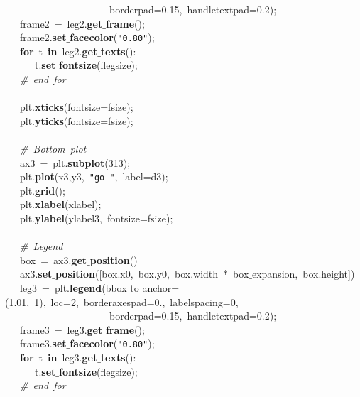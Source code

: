 \mbox{}\ \ \ \ \ \ \ \ \ \ \ \ \ \ \ \ \ \ \ \ \ borderpad=0.15,\ handletextpad=0.2); \\
\mbox{}\ \ \ frame2\ =\ leg2.\textbf{get$\_$frame}(); \\
\mbox{}\ \ \ frame2.\textbf{set$\_$facecolor}(\texttt{"{}0.80"{}}); \\
\mbox{}\ \ \ \textbf{for}\ t\ \textbf{in}\ leg2.\textbf{get$\_$texts}(): \\
\mbox{}\ \ \ \ \ \ t.\textbf{set$\_$fontsize}(flegsize); \\
\mbox{}\ \ \ \textit{\#\ end\ for} \\
\mbox{}\ \ \  \\
\mbox{}\ \ \ plt.\textbf{xticks}(fontsize=fsize); \\
\mbox{}\ \ \ plt.\textbf{yticks}(fontsize=fsize); \\
\mbox{}\ \ \  \\
\mbox{}\ \ \ \textit{\#\ Bottom\ plot} \\
\mbox{}\ \ \ ax3\ =\ plt.\textbf{subplot}(313); \\
\mbox{}\ \ \ plt.\textbf{plot}(x3,y3,\ \texttt{"{}go-"{}},\ label=d3); \\
\mbox{}\ \ \ plt.\textbf{grid}(); \\
\mbox{}\ \ \ plt.\textbf{xlabel}(xlabel); \\
\mbox{}\ \ \ plt.\textbf{ylabel}(ylabel3,\ fontsize=fsize); \\
\mbox{}\ \ \  \\
\mbox{}\ \ \ \textit{\#\ Legend} \\
\mbox{}\ \ \ box\ =\ ax3.\textbf{get$\_$position}() \\
\mbox{}\ \ \ ax3.\textbf{set$\_$position}([box.x0,\ box.y0,\ box.width\ *\ box$\_$expansion,\ box.height]) \\
\mbox{}\ \ \ leg3\ =\ plt.\textbf{legend}(bbox$\_$to$\_$anchor=(1.01,\ 1),\ loc=2,\ borderaxespad=0.,\ labelspacing=0,\  \\
\mbox{}\ \ \ \ \ \ \ \ \ \ \ \ \ \ \ \ \ \ \ \ \ borderpad=0.15,\ handletextpad=0.2); \\
\mbox{}\ \ \ frame3\ =\ leg3.\textbf{get$\_$frame}(); \\
\mbox{}\ \ \ frame3.\textbf{set$\_$facecolor}(\texttt{"{}0.80"{}}); \\
\mbox{}\ \ \ \textbf{for}\ t\ \textbf{in}\ leg3.\textbf{get$\_$texts}(): \\
\mbox{}\ \ \ \ \ \ t.\textbf{set$\_$fontsize}(flegsize); \\
\mbox{}\ \ \ \textit{\#\ end\ for} \\
